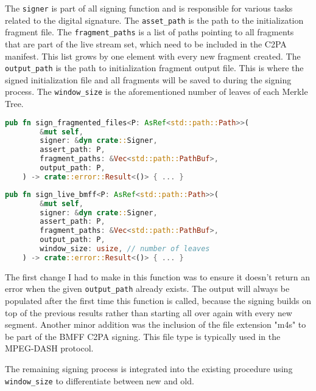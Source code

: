The \texttt{signer} is part of all signing function and is responsible for various tasks related to the digital signature. The \texttt{asset\_path} is the path to the initialization fragment file. The \texttt{fragment\_paths} is a list of paths pointing to all fragments that are part of the live stream set, which need to be included in the C2PA manifest. This list grows by one element with every new fragment created. The \texttt{output\_path} is the path to initialization fragment output file. This is where the signed initialization file and all fragments will be saved to during the signing process. The \texttt{window\_size} is the aforementioned number of leaves of each Merkle Tree. 

\begin{minipage}{\linewidth}
\begin{lstlisting}[caption={Original Signing Function}, label=code:fragment_bmff, language=Rust, captionpos=b]
    pub fn sign_fragmented_files<P: AsRef<std::path::Path>>(
        &mut self,
        signer: &dyn crate::Signer,
        assert_path: P,
        fragment_paths: &Vec<std::path::PathBuf>,
        output_path: P,
    ) -> crate::error::Result<()> { ... }
\end{lstlisting}
\end{minipage}

\begin{minipage}{\linewidth}
\begin{lstlisting}[caption={New Live Signing Function}, label=code:live_sign, language=Rust, captionpos=b]
    pub fn sign_live_bmff<P: AsRef<std::path::Path>>(
        &mut self,
        signer: &dyn crate::Signer,
        assert_path: P,
        fragment_paths: &Vec<std::path::PathBuf>,
        output_path: P,
        window_size: usize, // number of leaves
    ) -> crate::error::Result<()> { ... }
\end{lstlisting}
\end{minipage}

The first change I had to make in this function was to ensure it doesn't return an error when the given \texttt{output\_path} already exists. The output will always be populated after the first time this function is called, because the signing builds on top of the previous results rather than starting all over again with every new segment. Another minor addition was the inclusion of the file extension "m4s" to be part of the BMFF C2PA signing. This file type is typically used in the MPEG-DASH protocol.

The remaining signing process is integrated into the existing procedure using \texttt{window\_size} to differentiate between new and old.

